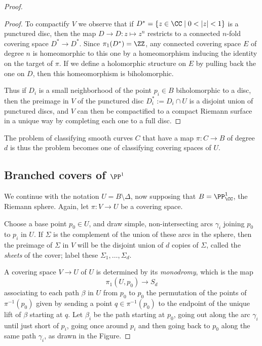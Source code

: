 \begin{proof}
\begin{proof}
To compactify $V$ we observe that if $D^* = \{ z \in \CC \mid 0 < |z| < 1 \}$ is a punctured disc, then
the map $D\to D: z \mapsto z^n$ restricts to a connected $n$-fold covering space $D^*\to D^*$. 
Since $\pi_1(D^*) = \ZZ$, any connected covering space $E$ of degree $n$ is homeomorphic to this one
by a homeomorphism inducing the identity on the target of $\pi$.
If we  define a holomorphic structure on $E$ by pulling back the one on $D$, then
this homeomorphism is biholomorphic.

Thus if $D_i$ is a small neighborhood of the point $p_i \in B$ biholomorphic to a disc, then the preimage  in $V$ of the punctured disc $D_i^* := D_i \cap U$ is a disjoint union of punctured discs, and $V$ can then be compactified to a compact Riemann surface in a unique way by completing each one to a full disc.
\end{proof}
   
 The problem of classifying smooth curves $C$ that have a map $\pi : C \to B$ of degree $d$ is thus the problem becomes one of classifying covering spaces of $U$. 
    
 \subsection{Branched covers of $\PP^1$} 

We continue with the notation $U = B\setminus \Delta$, now supposing that $B = \PP^1_\CC$, the Riemann sphere. Again, let $\pi:V\to U$ be a covering space.

Choose a base point $p_0 \in U$, and draw simple, non-intersecting arcs $\gamma_i$ joining $p_0$ to $p_i$ in $U$. If $\Sigma$ is the complement of the union of these arcs in the sphere, then the preimage of $\Sigma$ in $V$ will be the disjoint union of $d$ copies of $\Sigma$, called the \emph{sheets} of the cover; label these $\Sigma_1,\dots,\Sigma_d$.

   
A covering space $V \to U$ of $U$ is determined by its \emph{monodromy}, which is the map
   $$
   \pi_1(U, p_0) \to S_d
   $$
associating to each path  $\beta$ in $U$ from $p_0$ to $p_0$  the permutation of the points of $\pi^{-1}(p_0)$ given by sending a point $q \in \pi^{-1}(p_0)$ to the endpoint of the unique lift of $\beta$ starting at $q$. Let $\beta_i$ be the path starting at $p_0$, going out along the arc $\gamma_i$ until just short of $p_i$, going once around $p_i$ and then going back to $p_0$ along the same path $\gamma_i$, as drawn in the Figure. 


\end{proof}
